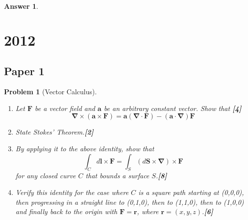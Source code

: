 \documentclass[a4paper]{article}
\newtheorem{ans}{Answer}[section]
\theoremstyle{new}
\newtheorem{qns}{Problem}[section]
\begin{document}
\begin{ans}
\begin{enumerate}[label=(\roman*)]
\end{enumerate}

\end{ans}
\newpage
\section{2012}
\subsection{Paper 1}
\begin{qns}[Vector Calculus]\leavevmode
\begin{enumerate}[label=(\alph*)]
    \item Let $\mathbf{F}$ be a vector field and $\mathbf{a}$ be an arbitrary constant vector. Show that \hfill \textbf{[4]}
$$\boldsymbol{\nabla}\times(\mathbf{a}\times\mathbf{F})=\mathbf{a}(\boldsymbol{\nabla}\cdot\mathbf{F})-(\mathbf{a}\cdot\boldsymbol{\nabla})\mathbf{F}$$
\item State Stokes' Theorem.\hfill \textbf{[2]}
\item By applying it to the above identity, show that 
$$\int_C d\mathbf{l}\times\mathbf{F}=\int_S(d\mathbf{S}\times\boldsymbol{\nabla})\times\mathbf{F}$$
for any closed curve $C$ that bounds a surface $S$.\hfill \textbf{[8]}
\item Verify this identity for the case where $C$ is a square path starting at (0,0,0), then progressing in a straight line to (0,1,0), then to (1,1,0), then to (1,0,0) and finally back to the origin with $\mathbf{F}=\mathbf{r}$, where $\mathbf{r}=(x,y,z)$.\hfill \textbf{[6]}
\end{enumerate}
\end{qns}
\end{document}
